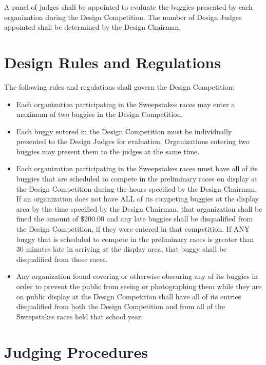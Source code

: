 	A panel of judges shall be appointed to evaluate the buggies presented by each
	organization during the Design Competition. The number of Design Judges
	appointed shall be determined by the Design Chairman.

\section{Design Rules and Regulations}
	
	The following rules and regulations shall govern the Design Competition:

	\begin{itemize}

		\item
		Each organization participating in the Sweepstakes races may enter a maximum of
		two buggies in the Design Competition.

		\item
		Each buggy entered in the Design Competition must be individually presented to
		the Design Judges for evaluation. Organizations entering two buggies may
		present them to the judges at the same time.

		\item
		Each organization participating in the Sweepstakes races must have all of its
		buggies that are scheduled to compete in the preliminary races on display at
		the Design Competition during the hours specified by the Design Chairman. If an
		organization does not have ALL of its competing buggies at the display area by
		the time specified by the Design Chairman, that organization shall be fined the
		amount of \$200.00 and any late buggies shall be disqualified from the Design
		Competition, if they were entered in that competition. If ANY buggy that is
		scheduled to compete in the preliminary races is greater than 30 minutes late
		in arriving at the display area, that buggy shall be disqualified from those
		races.

		\item
		Any organization found covering or otherwise obscuring any of its buggies in
		order to prevent the public from seeing or photographing them while they are on
		public display at the Design Competition shall have all of its entries
		disqualified from both the Design Competition and from all of the Sweepstakes
		races held that school year.

	\end{itemize}

\section{Judging Procedures}

